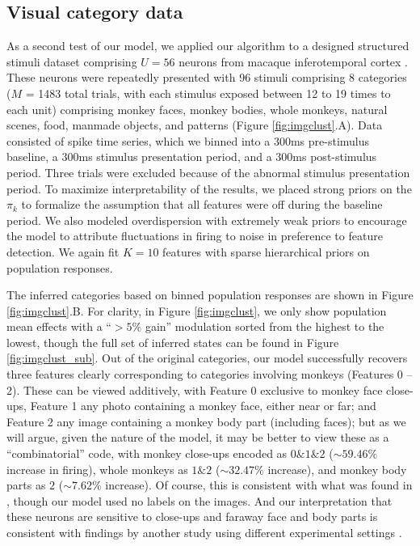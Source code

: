 \documentclass[12pt,a4paper]{article}
\begin{document}
\subsection*{Visual category data}
\label{it_neuron_expt}
As a second test of our model, we applied our algorithm to a designed structured stimuli dataset comprising $U = 56$ neurons from macaque inferotemporal cortex \cite{McMahon2014-qq}. These neurons were repeatedly presented with 96 stimuli comprising 8 categories ($M$ = 1483 total trials, with each stimulus exposed between 12 to 19 times to each unit) comprising monkey faces, monkey bodies, whole monkeys, natural scenes, food, manmade objects, and patterns (Figure \ref{fig:imgclust}.A). Data consisted of spike time series, which we binned into a 300ms pre-stimulus baseline, a 300ms stimulus presentation period, and a 300ms post-stimulus period. Three trials were excluded because of the abnormal stimulus presentation period. To maximize interpretability of the results, we placed strong priors on the $\pi_k$ to formalize the assumption that all features were off during the baseline period. We also modeled overdispersion with extremely weak priors to encourage the model to attribute fluctuations in firing to noise in preference to feature detection. We again fit $K = 10$ features with sparse hierarchical priors on population responses.

The inferred categories based on binned population responses are shown in Figure \ref{fig:imgclust}.B. For clarity, in Figure \ref{fig:imgclust}, we only show population mean effects with a ``$>5\%$ gain'' modulation sorted from the highest to the lowest, though the full set of inferred states can be found in Figure \ref{fig:imgclust_sub}. Out of the original categories, our model successfully recovers three features clearly corresponding to categories involving monkeys (Features 0 -- 2). These can be viewed additively, with Feature 0 exclusive to monkey face close-ups, Feature 1 any photo containing a monkey face, either near or far; and Feature 2 any image containing a monkey body part (including faces); but as we will argue, given the nature of the model, it may be better to view these as a ``combinatorial'' code, with monkey close-ups encoded as $0\& 1\& 2$ ($\sim 59.46\%$ increase in firing), whole monkeys as $1\& 2$ ($\sim 32.47\%$ increase), and monkey body parts as $2$ ($\sim 7.62\%$ increase). Of course, this is consistent with what was found in \cite{McMahon2014-qq}, though our model used no labels on the images. And our interpretation that these neurons are sensitive to close-ups and faraway face and body parts is consistent with findings by another study using different experimental settings \cite{McMahon5537}.
\end{document}
